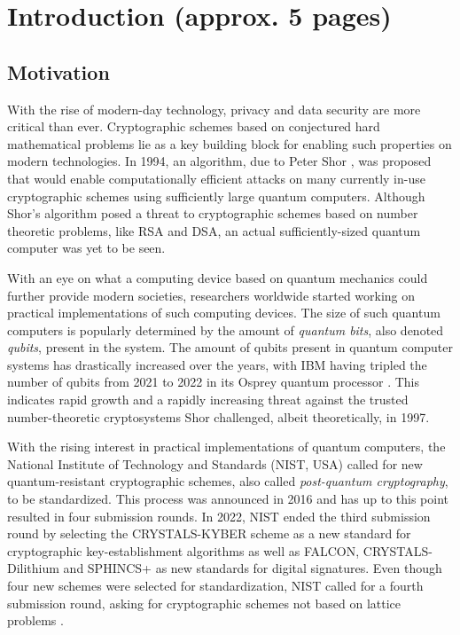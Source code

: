 \section{Introduction (approx. 5 pages)} \label{sec:intro}
\subsection{Motivation}
With the rise of modern-day technology, privacy and data security are more critical than ever. Cryptographic schemes based on conjectured hard mathematical problems lie as a key building block for enabling such properties on modern technologies. In 1994, an algorithm, due to Peter Shor \cite{Shor_1997}, was proposed that would enable computationally efficient attacks on many currently in-use cryptographic schemes using sufficiently large quantum computers. Although Shor's algorithm posed a threat to cryptographic schemes based on number theoretic problems, like RSA and DSA, an actual sufficiently-sized quantum computer was yet to be seen. 

With an eye on what a computing device based on quantum mechanics could further provide modern societies, researchers worldwide started working on practical implementations of such computing devices. The size of such quantum computers is popularly determined by the amount of \textit{quantum bits}, also denoted \textit{qubits}, present in the system. The amount of qubits present in quantum computer systems has drastically increased over the years, with IBM having tripled the number of qubits from 2021 to 2022 in its Osprey quantum processor \cite{IBM_Osprey}. This indicates rapid growth and a rapidly increasing threat against the trusted number-theoretic cryptosystems Shor challenged, albeit theoretically, in 1997.

With the rising interest in practical implementations of quantum computers, the National Institute of Technology and Standards (NIST, USA) called for new quantum-resistant cryptographic schemes, also called \textit{post-quantum cryptography}, to be standardized. This process was announced in 2016 and has up to this point resulted in four submission rounds. In 2022, NIST ended the third submission round by selecting the CRYSTALS-KYBER scheme as a new standard for cryptographic key-establishment algorithms as well as FALCON, CRYSTALS-Dilithium and SPHINCS+ as new standards for digital signatures. Even though four new schemes were selected for standardization, NIST called for a fourth submission round, asking for cryptographic schemes not based on lattice problems \cite{nist_third_rd_update}.

